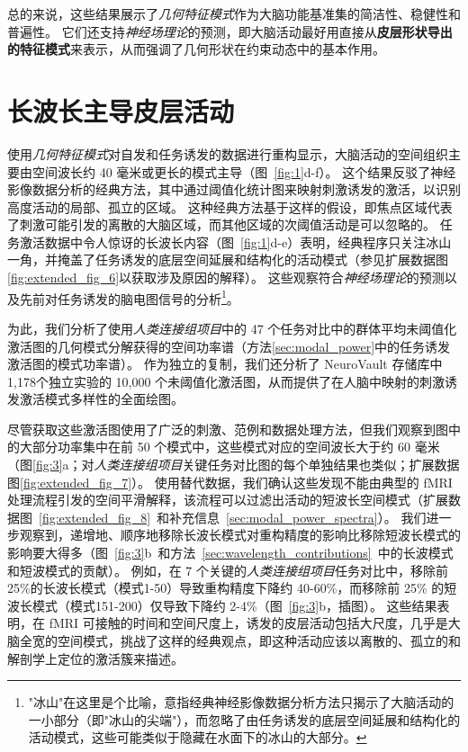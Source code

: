 \documentclass[lang=cn,a4paper,newtx,citestyle=gb7714-2015, bibstyle=gb7714-2015]{elegantpaper}
\begin{document}
总的来说，这些结果展示了\textit{几何特征模式}作为大脑功能基准集的简洁性、稳健性和普遍性。
它们还支持\textit{神经场理论}的预测，即大脑活动最好用直接从\textbf{皮层形状导出的特征模式}来表示，从而强调了几何形状在约束动态中的基本作用。




\section{长波长主导皮层活动}

使用\textit{几何特征模式}对自发和任务诱发的数据进行重构显示，大脑活动的空间组织主要由空间波长约 40 毫米或更长的模式主导（图~\ref{fig:1}d-f）。
这个结果反驳了神经影像数据分析的经典方法，其中通过阈值化统计图来映射刺激诱发的激活，以识别高度活动的局部、孤立的区域。
这种经典方法基于这样的假设，即焦点区域代表了刺激可能引发的离散的大脑区域，而其他区域的次阈值活动是可以忽略的。
任务激活数据中令人惊讶的长波长内容（图~\ref{fig:1}d-e）表明，经典程序只关注冰山一角，并掩盖了任务诱发的底层空间延展和结构化的活动模式（参见扩展数据图\ref{fig:extended_fig_6}以获取涉及原因的解释）。
这些观察符合\textit{神经场理论}的预测以及先前对任务诱发的脑电图信号的分析\footnote{"冰山"在这里是个比喻，意指经典神经影像数据分析方法只揭示了大脑活动的一小部分（即"冰山的尖端"），而忽略了由任务诱发的底层空间延展和结构化的活动模式，这些可能类似于隐藏在水面下的冰山的大部分。}。


为此，我们分析了使用\textit{人类连接组项目}中的 47 个任务对比中的群体平均未阈值化激活图的几何模式分解获得的空间功率谱（方法\ref{sec:modal_power}中的任务诱发激活图的模式功率谱）。
作为独立的复制，我们还分析了 NeuroVault 存储库中1,178个独立实验的 10,000 个未阈值化激活图，从而提供了在人脑中映射的刺激诱发激活模式多样性的全面绘图。


尽管获取这些激活图使用了广泛的刺激、范例和数据处理方法，但我们观察到图中的大部分功率集中在前 50 个模式中，这些模式对应的空间波长大于约 60 毫米（图\ref{fig:3}a；对\textit{人类连接组项目}关键任务对比图的每个单独结果也类似；扩展数据图\ref{fig:extended_fig_7}）。
使用替代数据，我们确认这些发现不能由典型的 fMRI 处理流程引发的空间平滑解释，该流程可以过滤出活动的短波长空间模式（扩展数据图~\ref{fig:extended_fig_8}~和补充信息~\ref{sec:modal_power_spectra}）。
我们进一步观察到，递增地、顺序地移除长波长模式对重构精度的影响比移除短波长模式的影响要大得多（图~\ref{fig:3}b~和方法~\ref{sec:wavelength_contributions}~中的长波模式和短波模式的贡献）。
例如，在 7 个关键的\textit{人类连接组项目}任务对比中，移除前25\%的长波长模式（模式1-50）导致重构精度下降约 40-60\%，而移除前 25\% 的短波长模式（模式151-200）仅导致下降约 2-4\%（图~\ref{fig:3}b，插图）。
这些结果表明，在 fMRI 可接触的时间和空间尺度上，诱发的皮层活动包括大尺度，几乎是大脑全宽的空间模式，挑战了这样的经典观点，即这种活动应该以离散的、孤立的和解剖学上定位的激活簇来描述。
\end{document}
